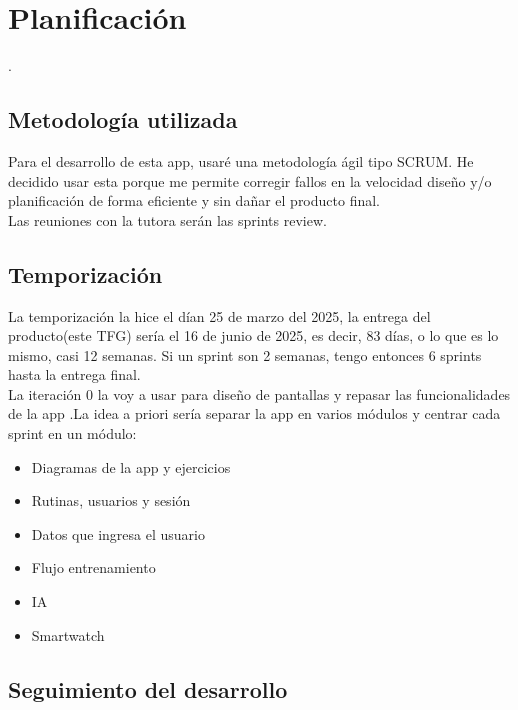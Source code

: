 \chapter{Planificación}
.
\section{Metodología utilizada}
Para el desarrollo de esta app, usaré una metodología ágil tipo SCRUM. He decidido usar esta porque me permite corregir fallos en la velocidad diseño y/o planificación de forma eficiente y sin dañar el producto final.\\

Las reuniones con la tutora serán las sprints review.
\section{Temporización}

La temporización la hice el dían 25 de marzo del 2025, la entrega del producto(este TFG) sería el 16 de junio de 2025,
es decir, 83 días, o lo que es lo mismo, casi 12 semanas. Si un sprint son 2 semanas, tengo entonces 6 sprints hasta la entrega final.\\
La iteración 0 la voy a usar para diseño de pantallas y repasar las funcionalidades de la app .La idea a priori sería separar la app en varios módulos y centrar cada sprint en un módulo:
\begin{itemize}
	\item Diagramas de la app y ejercicios
	\item Rutinas, usuarios y sesión
	\item Datos que ingresa el usuario
	\item Flujo entrenamiento
	\item IA
	\item Smartwatch
\end{itemize}

\clearpage
\section{Seguimiento del desarrollo}
